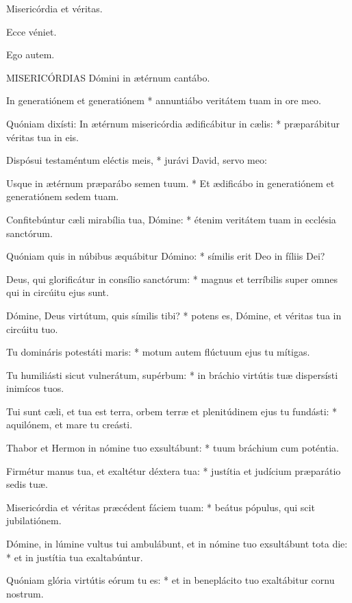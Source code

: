 
  Misericórdia et véritas.


  Ecce véniet.

  Ego autem.

\lettrine[lines=2]{M}{ISERICÓRDIAS} Dómini in ætérnum cantábo.

In generatiónem et generatiónem * annuntiábo veritátem tuam in ore meo.

Quóniam dixísti: In ætérnum misericórdia ædificábitur in cælis: * præparábitur véritas tua in eis.

Dispósui testaméntum eléctis meis, * jurávi David, servo meo:

Usque in ætérnum præparábo semen tuum. * Et ædificábo in generatiónem et generatiónem sedem tuam.

Confitebúntur cæli mirabília tua, Dómine: * étenim veritátem tuam in ecclésia sanctórum.

Quóniam quis in núbibus æquábitur Dómino: * símilis erit Deo in fíliis Dei?

Deus, qui glorificátur in consílio sanctórum: * magnus et terríbilis super omnes qui in circúitu ejus sunt.

Dómine, Deus virtútum, quis símilis tibi? * potens es, Dómine, et véritas tua in circúitu tuo.

Tu domináris potestáti maris: * motum autem flúctuum ejus tu mítigas.

Tu humiliásti sicut vulnerátum, supérbum: * in bráchio virtútis tuæ dispersísti inimícos tuos.

Tui sunt cæli, et tua est terra, orbem terræ et plenitúdinem ejus tu fundásti: * aquilónem, et mare tu creásti.

Thabor et Hermon in nómine tuo exsultábunt: * tuum bráchium cum poténtia.

Firmétur manus tua, et exaltétur déxtera tua: * justítia et judícium præparátio sedis tuæ.

Misericórdia et véritas præcédent fáciem tuam: * beátus pópulus, qui scit jubilatiónem.

Dómine, in lúmine vultus tui ambulábunt, et in nómine tuo exsultábunt tota die: * et in justítia tua exaltabúntur.

Quóniam glória virtútis eórum tu es: * et in beneplácito tuo exaltábitur cornu nostrum.


